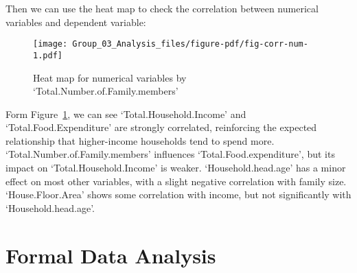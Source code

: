 \documentclass[
]{article}
\newenvironment{Shaded}{\begin{snugshade}}{\end{snugshade}}
\newcommand{\AttributeTok}[1]{\textcolor[rgb]{0.40,0.45,0.13}{#1}}
\newcommand{\CommentTok}[1]{\textcolor[rgb]{0.37,0.37,0.37}{#1}}
\newcommand{\ConstantTok}[1]{\textcolor[rgb]{0.56,0.35,0.01}{#1}}
\newcommand{\DecValTok}[1]{\textcolor[rgb]{0.68,0.00,0.00}{#1}}
\newcommand{\FunctionTok}[1]{\textcolor[rgb]{0.28,0.35,0.67}{#1}}
\newcommand{\NormalTok}[1]{\textcolor[rgb]{0.00,0.23,0.31}{#1}}
\newcommand{\OtherTok}[1]{\textcolor[rgb]{0.00,0.23,0.31}{#1}}
\newcommand{\SpecialCharTok}[1]{\textcolor[rgb]{0.37,0.37,0.37}{#1}}
\newcommand{\StringTok}[1]{\textcolor[rgb]{0.13,0.47,0.30}{#1}}
\begin{document}
\begin{Shaded}
\end{Shaded}

Then we can use the heat map to check the correlation between numerical
variables and dependent variable:

\begin{figure}[H]

{\centering \texttt{[image: Group\_03\_Analysis\_files/figure-pdf/fig-corr-num-1.pdf]}

}

\caption{\label{fig-corr-num}Heat map for numerical variables by
`Total.Number.of.Family.members'}

\end{figure}

Form Figure~\ref{fig-corr-num}, we can see `Total.Household.Income' and
`Total.Food.Expenditure' are strongly correlated, reinforcing the
expected relationship that higher-income households tend to spend more.
`Total.Number.of.Family.members' influences `Total.Food.expenditure',
but its impact on `Total.Household.Income' is weaker.
`Household.head.age' has a minor effect on most other variables, with a
slight negative correlation with family size. `House.Floor.Area' shows
some correlation with income, but not significantly with
`Household.head.age'.

\hypertarget{formal-data-analysis}{%
\section{Formal Data Analysis}\label{formal-data-analysis}}
\end{document}
